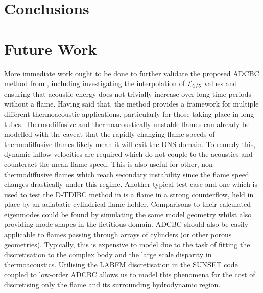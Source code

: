 \section{Conclusions}





\section{Future Work}

More immediate work ought to be done to further validate the proposed ADCBC method from , including investigating the interpolation of $\mathcal{L}_{1/5}$ values and ensuring that acoustic energy does not trivially increase over long time periods without a flame. Having said that, the method provides a framework for multiple different thermoacoustic applications, particularly for those taking place in long tubes. Thermodiffusive and thermoacoustically unstable flames can already be modelled with the caveat that the rapidly changing flame speeds of thermodiffusive flames likely mean it will exit the DNS domain. To remedy this, dynamic inflow velocities are required which do not couple to the acoustics and counteract the mean flame speed. This is also useful for other, non-thermodiffusive flames which reach secondary instability since the flame speed changes drastically under this regime. Another typical test case and one which is used to test the D-TDIBC method in \cite{douasbin2018DelayedtimeDomainImpedance} is a flame in a strong counterflow, held in place by an adiabatic cylindrical flame holder. Comparisons to their calculated eigenmodes could be found by simulating the same model geometry whilst also providing mode shapes in the fictitious domain. ADCBC should also be easily applicable to flames passing through arrays of cylinders (or other porous geometries). Typically, this is expensive to model due to the task of fitting the discretisation to the complex body and the large scale disparity in thermoacoustics. Utilising the LABFM discretisation in the SUNSET code coupled to low-order ADCBC allows us to model this phenomena for the cost of discretising only the flame and its surrounding hydrodynamic region.

